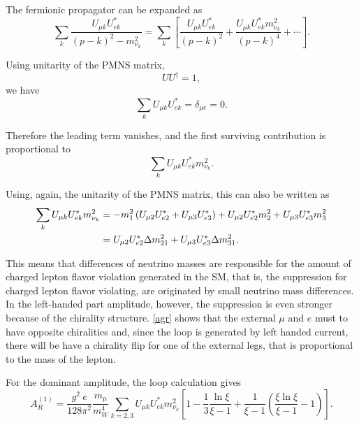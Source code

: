 \documentclass[11pt]{article}
\begin{document}
The fermionic propagator can be expanded as
\begin{equation}
    \sum_k
    \frac{U_{\mu k}U^*_{ek}}
    {(p-k)^2-m_{\nu_k}^2}
    =
    \sum_k
    \left[
        \frac{U_{\mu k}U^*_{ek}}{(p-k)^2}
        +
        \frac{U_{\mu k}U^*_{ek}m_{\nu_k}^2}{(p-k)^4}
        + \cdots
    \right].
\end{equation}

Using unitarity of the PMNS matrix,
\begin{equation}
    UU^\dagger = 1,
\end{equation}
we have
\begin{equation}
    \sum_k U_{\mu k}U^*_{ek} = \delta_{\mu e}=0.
\end{equation}

Therefore the leading term vanishes, and the first surviving contribution is proportional to
\begin{equation}
    \sum_k U_{\mu k}U^*_{ek}m_{\nu_k}^2.
\end{equation}

Using, again, the unitarity of the PMNS matrix, this can also be written as
\begin{align}
    \sum_k U_{\mu k}U^*_{ek}m_{\nu_k}^2
    &=
    -m_1^2
    \left(
        U_{\mu 2}U^*_{e2}
        +
        U_{\mu 3}U^*_{e3}
    \right)
    +
    U_{\mu 2}U^*_{e2}m_2^2
    +
    U_{\mu 3}U^*_{e3}m_3^2
    \notag \\
    &=
    U_{\mu 2}U^*_{e2}\Delta m_{21}^2
    +
    U_{\mu 3}U^*_{e3}\Delta m_{31}^2.
\end{align}

This means that differences of neutrino masses are responsible for the amount of charged lepton flavor violation generated in the SM, that is, the suppression
for charged lepton flavor violating, are originated by small neutrino mass differences. In the left-handed part amplitude, however, the suppression is even stronger because of the chirality structure. \eqref{agr} shows that the external $\mu$ and $e$ must to have opposite chiralities and, since the loop is generated by left handed current, there will be have a chirality flip for one of the external legs, that is proportional to the mass of the lepton.

For the dominant amplitude, the loop calculation gives
\begin{equation}
    A^{(1)}_R
    =
    \frac{g^2\ e}{128\pi^2}
    \frac{m_\mu}{m_W^4}
    \sum_{k=2,3}
    U_{\mu k}U^*_{ek}m_{\nu_k}^2
    \left[1
        -\frac{1}{3}\frac{\ln\xi}{\xi-1}
        +
        \frac{1}{\xi-1}
        \left(
            \frac{\xi\ln \xi}{\xi-1}
            -1
        \right)
    \right].
    \label{AR}
\end{equation}
\end{document}
